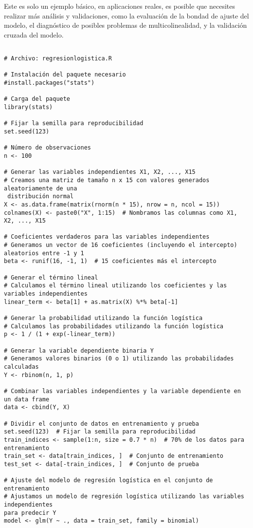 Este es solo un ejemplo básico, en aplicaciones reales, es posible que necesites realizar más análisis y validaciones, como la evaluación de la bondad de ajuste del modelo, el diagnóstico de posibles problemas de multicolinealidad, y la validación cruzada del modelo.
\begin{verbatim}

# Archivo: regresionlogistica.R

# Instalación del paquete necesario
#install.packages("stats")

# Carga del paquete
library(stats)

# Fijar la semilla para reproducibilidad
set.seed(123)

# Número de observaciones
n <- 100

# Generar las variables independientes X1, X2, ..., X15
# Creamos una matriz de tamaño n x 15 con valores generados aleatoriamente de una
 distribución normal
X <- as.data.frame(matrix(rnorm(n * 15), nrow = n, ncol = 15))
colnames(X) <- paste0("X", 1:15)  # Nombramos las columnas como X1, X2, ..., X15

# Coeficientes verdaderos para las variables independientes
# Generamos un vector de 16 coeficientes (incluyendo el intercepto) aleatorios entre -1 y 1
beta <- runif(16, -1, 1)  # 15 coeficientes más el intercepto

# Generar el término lineal
# Calculamos el término lineal utilizando los coeficientes y las variables independientes
linear_term <- beta[1] + as.matrix(X) %*% beta[-1]

# Generar la probabilidad utilizando la función logística
# Calculamos las probabilidades utilizando la función logística
p <- 1 / (1 + exp(-linear_term))

# Generar la variable dependiente binaria Y
# Generamos valores binarios (0 o 1) utilizando las probabilidades calculadas
Y <- rbinom(n, 1, p)

# Combinar las variables independientes y la variable dependiente en un data frame
data <- cbind(Y, X)

# Dividir el conjunto de datos en entrenamiento y prueba
set.seed(123)  # Fijar la semilla para reproducibilidad
train_indices <- sample(1:n, size = 0.7 * n)  # 70% de los datos para entrenamiento
train_set <- data[train_indices, ]  # Conjunto de entrenamiento
test_set <- data[-train_indices, ]  # Conjunto de prueba

# Ajuste del modelo de regresión logística en el conjunto de entrenamiento
# Ajustamos un modelo de regresión logística utilizando las variables independientes 
para predecir Y
model <- glm(Y ~ ., data = train_set, family = binomial)


\end{verbatim}
